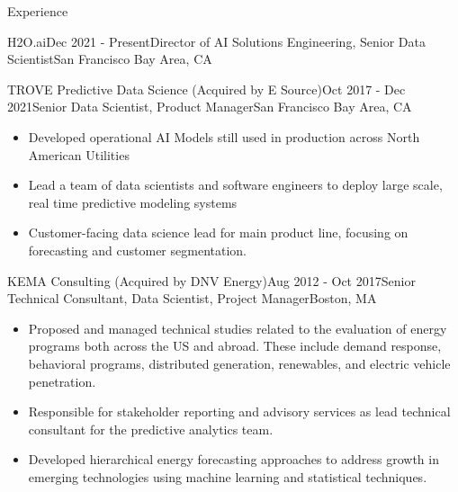 \documentclass{resume} %
\begin{document}
\begin{rSection}{Experience}
\begin{rSubsection}{H2O.ai}{Dec 2021 - Present}{Director of AI Solutions Engineering, Senior Data Scientist}{San Francisco Bay Area, CA}
\end{rSubsection}
\begin{rSubsection}{TROVE Predictive Data Science (Acquired by E Source)}{Oct 2017 - Dec 2021}{Senior Data Scientist, Product Manager}{San Francisco Bay Area, CA}
\begin{itemize}
	\item Developed operational AI Models still used in production across North American Utilities
	\item Lead a team of data scientists and software engineers to deploy large scale, real time predictive modeling systems
	\item Customer-facing data science lead for main product line, focusing on forecasting and customer segmentation.
\end{itemize}
\end{rSubsection}


\begin{rSubsection}{KEMA Consulting (Acquired by DNV Energy)}{Aug 2012 - Oct 2017}{Senior Technical Consultant, Data Scientist, Project Manager}{Boston, MA}
\begin{itemize}
\item Proposed and managed technical studies related to the evaluation of energy programs both across the US and abroad. These include demand response, behavioral programs, distributed generation, renewables, and electric vehicle  penetration.
\item Responsible for stakeholder reporting and advisory services as lead technical consultant for the  predictive analytics team.
\item Developed hierarchical energy forecasting approaches to address growth in emerging technologies using machine learning and statistical techniques.
\end{itemize}
\end{rSubsection}


\end{rSection}
\end{document}
